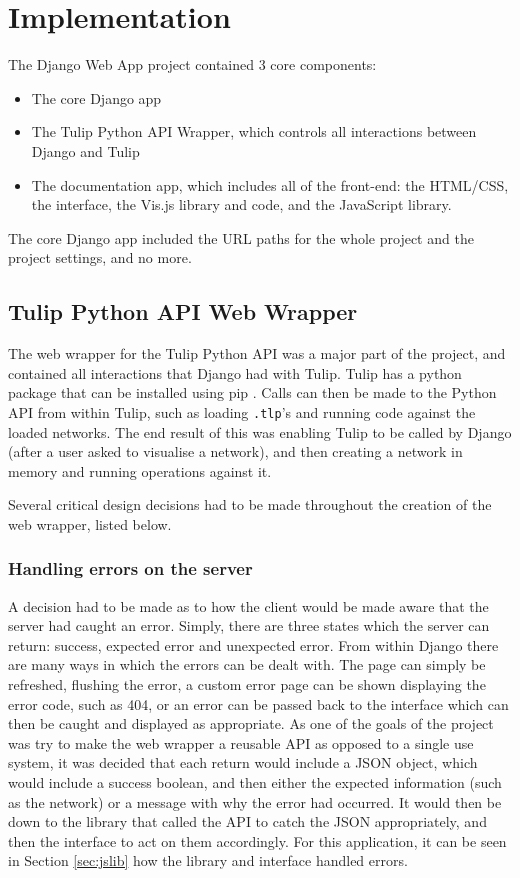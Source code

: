 \documentclass[../dissertation.tex]{subfiles}
\begin{document}
\chapter{Implementation}
\label{chap:impl}

The Django Web App project contained 3 core components: 

\begin{itemize}
    \item The core Django app
    \item The Tulip Python API Wrapper, which controls all interactions between Django and Tulip
    \item The documentation app, which includes all of the front-end: the HTML/CSS, the interface, the Vis.js library and code, and the JavaScript library.
\end{itemize}

The core Django app included the URL paths for the whole project and the project settings, and no more.

\section{Tulip Python API Web Wrapper}

The web wrapper for the Tulip Python API was a major part of the project, and contained all interactions that Django had with Tulip. Tulip has a python package \cite{tulippip} that can be installed using pip \cite{pip}. Calls can then be made to the Python API from within Tulip, such as loading \texttt{.tlp}'s and running code against the loaded networks. The end result of this was enabling Tulip to be called by Django (after a user asked to visualise a network), and then creating a network in memory and running operations against it. 

Several critical design decisions had to be made throughout the creation of the web wrapper, listed below.

\subsection{Handling errors on the server}

A decision had to be made as to how the client would be made aware that the server had caught an error. Simply, there are three states which the server can return: success, expected error and unexpected error. From within Django there are many ways in which the errors can be dealt with. The page can simply be refreshed, flushing the error, a custom error page can be shown displaying the error code, such as 404, or an error can be passed back to the interface which can then be caught and displayed as appropriate. As one of the goals of the project was try to make the web wrapper a reusable API as opposed to a single use system, it was decided that each return would include a JSON object, which would include a success boolean, and then either the expected information (such as the network) or a message with why the error had occurred. It would then be down to the library that called the API to catch the JSON appropriately, and then the interface to act on them accordingly. For this application, it can be seen in Section \ref{sec:jslib} how the library and interface handled errors.
\end{document}
